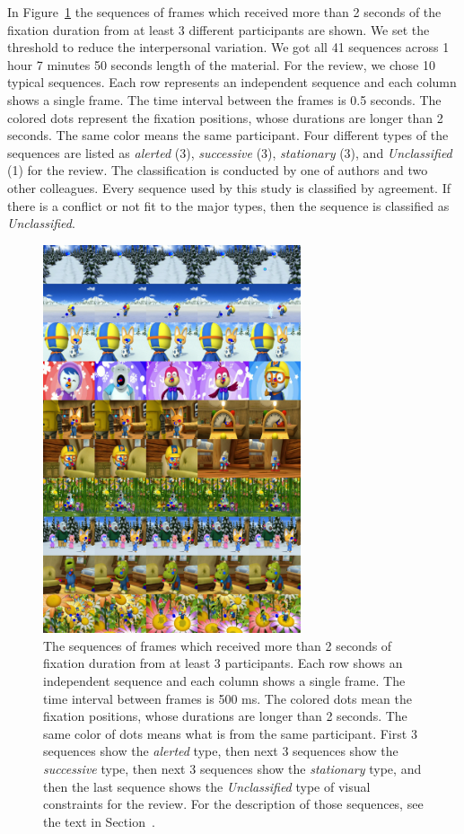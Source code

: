 \documentclass[oneside,master]{snueethesis}
\begin{document}
In Figure~\ref{fig:long-fixations} the sequences of frames which received more than 2 seconds of the fixation duration from at least 3 different participants are shown. We set the threshold to reduce the interpersonal variation. We got all 41 sequences across 1 hour 7 minutes 50 seconds length of the material. For the review, we chose 10 typical sequences. Each row represents an independent sequence and each column shows a single frame. The time interval between the frames is 0.5 seconds. The colored dots represent the fixation positions, whose durations are longer than 2 seconds. The same color means the same participant. Four different types of the sequences are listed as \textit{alerted} (3), \textit{successive} (3), \textit{stationary} (3), and \textit{Unclassified} (1) for the review. The classification is conducted by one of authors and two other colleagues. Every sequence used by this study is classified by agreement. If there is a conflict or not fit to the major types, then the sequence is classified as \textit{Unclassified}.

\begin{figure}
  \centerline{\includegraphics[width=76mm]{./eps/long_fixations_types.png}}
  \caption[The samples of sequence types]{The sequences of frames which received more than 2 seconds of fixation duration from at least 3 participants. Each row shows an independent sequence and each column shows a single frame. The time interval between frames is 500 ms. The colored dots mean the fixation positions, whose durations are longer than 2 seconds. The same color of dots means what is from the same participant. First 3 sequences show the \textit{alerted} type, then next 3 sequences show the \textit{successive} type, then next 3 sequences show the \textit{stationary} type, and then the last sequence shows the \textit{Unclassified} type of visual constraints for the review. For the description of those sequences, see the text in Section~\textit{}.}
  \label{fig:long-fixations}
\end{figure}
\end{document}
